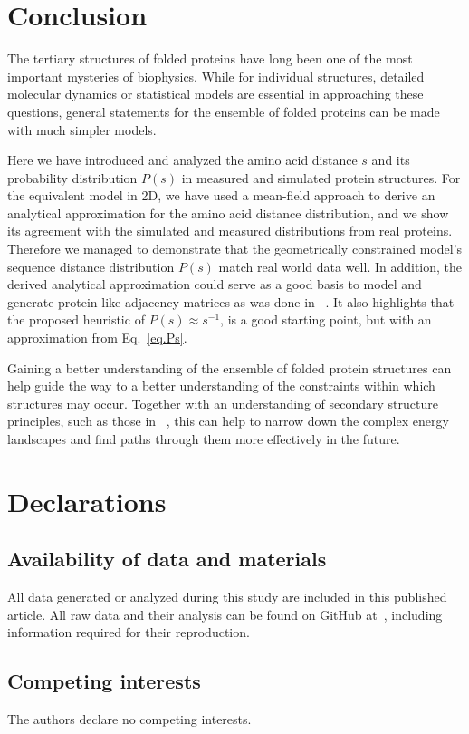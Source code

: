 \documentclass[
reprint,
twocolumn,
amsmath,amssymb,superscriptaddress,aps,
pre]{revtex4-1}
\begin{document}
\section{Conclusion}
The tertiary structures of folded proteins have long been one of the most important mysteries of biophysics. While for individual structures, detailed molecular dynamics or statistical models are essential in approaching these questions, general statements for the ensemble of folded proteins can be made with much simpler models.

Here we have introduced and analyzed the amino acid distance $s$ and its probability distribution $P(s)$ in measured and simulated protein structures. For the equivalent model in 2D, we have used a mean-field approach to derive an analytical approximation for the amino acid distance distribution, and we show its agreement with the simulated and measured distributions from real proteins.
Therefore we managed to demonstrate that the geometrically constrained model's sequence distance distribution $P(s)$ match real world data well. In addition, the derived analytical approximation could serve as a good basis to model and generate protein-like adjacency matrices as was done in ~\cite{bartoli2008effecta}. It also highlights that the proposed heuristic of $P(s)\approx s^{-1}$, is a good starting point, but with an  approximation from Eq.~\ref{eq.Ps}.

Gaining a better understanding of the ensemble of folded protein structures can help guide the way to a better understanding of the constraints within which structures may occur. Together with an understanding of secondary structure principles, such as those in
~\cite{Danielsson2010, Molkenthin2011}, this can help to narrow down the complex energy landscapes and find paths through them more effectively in the future.

\section*{Declarations}
\subsection{Availability of data and materials}
All data generated or analyzed during this study are included in this published article. All raw data and their analysis can be found on GitHub at~\cite{2022sequence}, including information required for their reproduction. 
\subsection{Competing interests}
The authors declare no competing interests.
\end{document}

